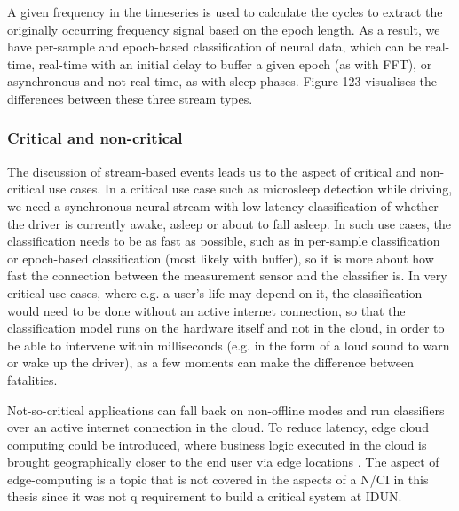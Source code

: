 A given frequency in the timeseries is used to calculate the cycles to extract the originally occurring frequency signal based on the epoch length. As a result, we have per-sample and epoch-based classification of neural data, which can be real-time, real-time with an initial delay to buffer a given epoch (as with FFT), or asynchronous and not real-time, as with sleep phases. Figure 123 visualises the differences between these three stream types.


\subsubsection{Critical and non-critical}
\label{chapter5-critical-and-non-critical}

The discussion of stream-based events leads us to the aspect of critical and non-critical use cases. In a critical use case such as microsleep detection while driving, we need a synchronous neural stream with low-latency classification of whether the driver is currently awake, asleep or about to fall asleep. In such use cases, the classification needs to be as fast as possible, such as in per-sample classification or epoch-based classification (most likely with buffer), so it is more about how fast the connection between the measurement sensor and the classifier is. In very critical use cases, where e.g. a user's life may depend on it, the classification would need to be done without an active internet connection, so that the classification model runs on the hardware itself and not in the cloud, in order to be able to intervene within milliseconds (e.g. in the form of a loud sound to warn or wake up the driver), as a few moments can make the difference between fatalities.

Not-so-critical applications can fall back on non-offline modes and run classifiers over an active internet connection in the cloud. To reduce latency, edge cloud computing could be introduced, where business logic executed in the cloud is brought geographically closer to the end user via edge locations \citep{nomios_what_nodate}. The aspect of edge-computing is a topic that is not covered in the aspects of a N/CI in this thesis since it was not q requirement to build a critical system at IDUN.

